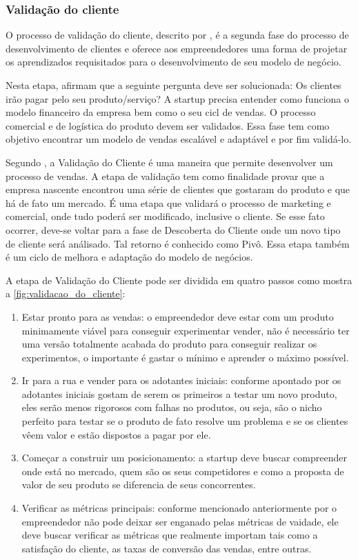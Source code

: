 \subsubsection{Validação do cliente}
\label{cha:validacao_do_cliente}
O processo de validação do cliente, descrito por , é a segunda fase do processo de desenvolvimento de clientes e oferece aos empreendedores uma forma de projetar os aprendizados requisitados para o desenvolvimento de seu modelo de negócio. 

Nesta etapa,  afirmam que a seguinte pergunta deve ser solucionada: Os clientes irão pagar pelo seu produto/serviço? A startup precisa entender como funciona o modelo financeiro da empresa bem como o seu cicl de vendas. O processo comercial e de logística do produto devem ser validados. Essa fase tem como objetivo encontrar um modelo de vendas escalável e adaptável e por fim validá-lo. 

Segundo , a Validação do Cliente é uma maneira que permite desenvolver um processo de vendas. A etapa de validação tem como finalidade provar que a empresa nascente encontrou uma série de clientes que gostaram do produto e que há de fato um mercado. É uma etapa que validará o processo de marketing e comercial, onde tudo poderá ser modificado, inclusive o cliente. Se esse fato ocorrer, deve-se voltar para a fase de Descoberta do Cliente onde um novo tipo de cliente será análisado. Tal retorno é conhecido como Pivô. Essa etapa também é um ciclo de melhora e adaptação do modelo de negócios.

A etapa de Validação do Cliente pode ser dividida em quatro passos como mostra a \autoref{fig:validacao_do_cliente}:
\begin{enumerate}
\item Estar pronto para as vendas: o empreendedor deve estar com um produto minimamente viável para conseguir experimentar vender, não é necessário ter uma versão totalmente acabada do produto para conseguir realizar os experimentos, o importante é gastar o mínimo e aprender o máximo possível.
\item Ir para a rua e vender para os adotantes iniciais: conforme apontado por  os adotantes iniciais gostam de serem os primeiros a testar um novo produto, eles serão menos rigorosos com falhas no produtos, ou seja, são o nicho perfeito para testar se o produto de fato resolve um problema e se os clientes vêem valor e estão dispostos a pagar por ele.
\item Começar a construir um posicionamento: a startup deve buscar compreender onde está no mercado, quem são os seus competidores e como a proposta de valor de seu produto se diferencia de seus concorrentes.
\item Verificar as métricas principais: conforme mencionado anteriormente por  o empreendedor não pode deixar ser enganado pelas métricas de vaidade, ele deve buscar verificar as métricas que realmente importam tais como a satisfação do cliente, as taxas de conversão das vendas, entre outras.
\end{enumerate}

